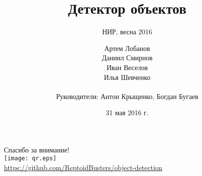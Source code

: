 \documentclass[10pt,pdf,hyperref={unicode}]{beamer}
\begin{document}
\title[Детектор объектов]{Детектор объектов}
\subtitle{НИР, весна 2016}
\author{Артем Лобанов \\ Даниил Смирнов \\ Иван Веселов \\ Илья Шевченко \\~\\
        Руководители: Антон Крыщенко, Богдан Бугаев}
\date{31 мая 2016 г.}

\begin{frame}
    \titlepage
\end{frame}






\begin{frame}
    \begin{center}
        Спасибо за внимание! \\
        \texttt{[image: qr.eps]} \\
        \url{https://github.com/ReptoidBusters/object-detection}
    \end{center}
\end{frame}
\end{document}
